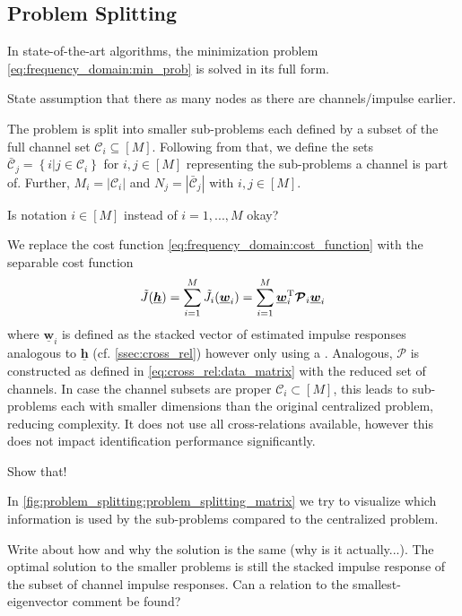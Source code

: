 \documentclass{article}
\newcommand{\hf}{\underline{\bm{h}}}
\newcommand{\wf}{\underline{\bm{w}}}
\newcommand{\aRhof}{\bm{\mathcal{P}}}
\newcommand{\Cset}{\mathcal{C}}
\newcommand{\Csetb}{\bar{\mathcal{C}}}
\begin{document}
\subsection{Problem Splitting}
\label{ssec:problem_splitting}
In state-of-the-art algorithms, the minimization problem \eqref{eq:frequency_domain:min_prob} is solved in its full form.
\begin{note}
    State assumption that there as many nodes as there are channels/impulse earlier.
\end{note}
The problem is split into smaller sub-problems each defined by a subset of the full channel set \(\Cset_i \subseteq [M]\).
Following from that, we define the sets \(\Csetb_j = \left\{ i \vert j \in \Cset_i \right\}\) for \(i,j \in [M]\) representing the sub-problems a channel is part of. 
Further, \(M_i = \left| \Cset_i \right| \) and \(N_j = \left| \Csetb_j \right| \) with \(i,j \in [M]\).
\begin{attention}
    Is notation \(i \in [M]\) instead of \(i=1,...,M\) okay?
\end{attention}
We replace the cost function \eqref{eq:frequency_domain:cost_function} with the separable cost function 
\begin{equation}
    \tilde{J}(\hf) = \sum_{i=1}^M \tilde{J}_i(\wf_i)  = \sum_{i=1}^M \wf_i^\T \aRhof_i \wf_i
\end{equation}
where \(\wf_i\) is defined as the stacked vector of estimated impulse responses analogous to \(\hf\) (cf. \autoref{ssec:cross_rel}) however only using a .
Analogous, \(\aRhof\) is constructed as defined in \eqref{eq:cross_rel:data_matrix} with the reduced set of channels.
In case the channel subsets are proper \(\Cset_i \subset [M]\), this leads to sub-problems each with smaller dimensions than the original centralized problem, reducing complexity.
It does not use all cross-relations available, however this does not impact identification performance significantly. 
\begin{attention}
    Show that!
\end{attention}
In \autoref{fig:problem_splitting:problem_splitting_matrix} we try to visualize which information is used by the sub-problems compared to the centralized problem.
\begin{attention}
    Write about how and why the solution is the same (why is it actually...). The optimal solution to the smaller problems is still the stacked impulse response of the subset of channel impulse responses. Can a relation to the smallest-eigenvector comment be found?
\end{attention}
\end{document}
